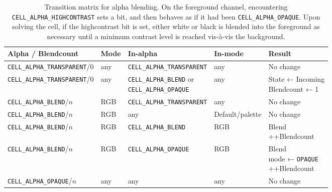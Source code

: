 \begin{table}[!htb]
  \begin{tabular}{|l|l|l|l|l|}
    \hline
    Alpha / Blendcount & Mode & In-alpha & In-mode & Result \\
    \hline
    \hline
    \texttt{CELL\_ALPHA\_TRANSPARENT}/0 & any & \texttt{CELL\_ALPHA\_TRANSPARENT} & any & No change \\
    \hline
    \texttt{CELL\_ALPHA\_TRANSPARENT}/0 & any & \makecell{\texttt{CELL\_ALPHA\_BLEND} or\\ \texttt{CELL\_ALPHA\_OPAQUE}} & any & \makecell{State ← Incoming\\ Blendcount ← 1} \\
    \hline
    \texttt{CELL\_ALPHA\_BLEND}/$n$ & RGB & \texttt{CELL\_ALPHA\_TRANSPARENT} & any & No change \\
    \hline
    \texttt{CELL\_ALPHA\_BLEND}/$n$ & RGB & any & Default/palette & No change \\
    \hline
    \texttt{CELL\_ALPHA\_BLEND}/$n$ & RGB & \texttt{CELL\_ALPHA\_BLEND} & RGB & \makecell{Blend\\ ++Blendcount}\\
    \hline
    \texttt{CELL\_ALPHA\_BLEND}/$n$ & RGB & \texttt{CELL\_ALPHA\_OPAQUE} & RGB & \makecell{Blend\\ mode ← \texttt{OPAQUE}\\ ++Blendcount}\\
    \hline
    \texttt{CELL\_ALPHA\_OPAQUE}/$n$ & any & any & any & No change \\
    \hline
  \end{tabular}
  \caption[Transition matrix for alpha blending.]{Transition matrix for alpha blending. On the foreground channel, encountering
    \texttt{CELL\_ALPHA\_HIGHCONTRAST} sets a bit, and then behaves as if it had been \texttt{CELL\_ALPHA\_OPAQUE}.
    Upon solving the cell, if the highcontrast bit is set, either white or black is blended into the foreground as
    necessary until a minimum contrast level is reached vis-à-vis the background.}
  \label{table:alphablend}
\end{table}


